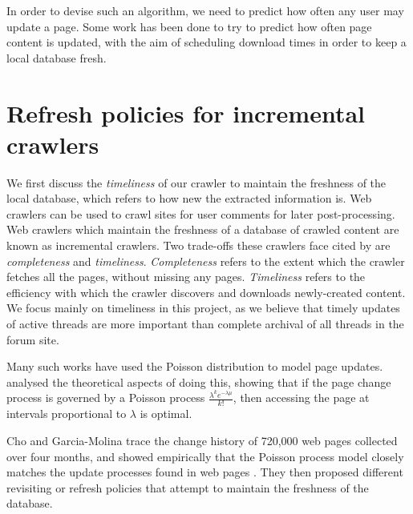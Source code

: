 In order to devise such an algorithm, we need to predict how often any user may 
update a page. Some work has been done to try to predict how often page content 
is updated, with the aim of scheduling download times in order to keep a local 
database fresh.


\section{Refresh policies for incremental crawlers}

We first discuss the \emph{timeliness} of our crawler to maintain the freshness 
of the local database, which refers to how new the extracted information is. Web 
crawlers can be used to crawl sites for user comments for 
later post-processing. Web crawlers which maintain the freshness of a database of 
crawled content are known as incremental crawlers. Two trade-offs these crawlers 
face cited by  are \emph{completeness} and \emph{timeliness}.  
\emph{Completeness} refers to the extent which the crawler fetches all the 
pages, without missing any pages. \emph{Timeliness} refers to the efficiency 
with which the crawler discovers and downloads newly-created content. We focus 
mainly on timeliness in this project, as we believe that timely updates of 
active threads are more important than complete archival of all threads in the 
forum site.

Many such works have used the Poisson distribution to model page updates.  
 analysed the theoretical aspects of doing this, showing 
that if the page change process is governed by a Poisson process 
$\frac{\lambda^k e^{-\lambda \mu}}{k!}$, then accessing the page at intervals 
proportional to $\lambda$ is optimal.

Cho and Garcia-Molina trace the change history of 720,000 web pages collected 
over four months, and showed empirically that the Poisson process model closely 
matches the update processes found in web pages \cite{Cho1999}. They then 
proposed different revisiting or refresh policies 
\cite{Cho2003,Garcia-molina2003} that attempt to maintain the freshness of the 
database.

